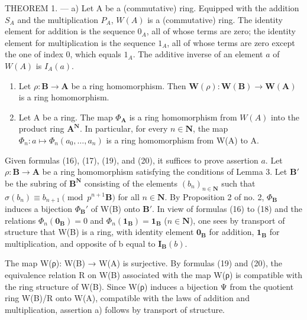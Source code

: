 THEOREM 1. --- a) Let A be a (commutative) ring. Equipped with the addition \(S_A\) and the multiplication \(P_A\), \(W(A)\) is a (commutative) ring. The identity element for addition is the sequence \(0_A\), all of whose terms are zero; the identity element for multiplication is the sequence \(1_A\), all of whose terms are zero except the one of index 0, which equals \(1_A\). The additive inverse of an element \(a\) of \(W(A)\) is \(I_A(a)\).

\begin{enumerate}
\def\labelenumi{\alph{enumi})}
\setcounter{enumi}{1}
\item
  Let \(\rho: \mathbf{B} \to \mathbf{A}\) be a ring homomorphism. Then \(\mathbf{W}(\rho): \mathbf{W}(\mathbf{B}) \to \mathbf{W}(\mathbf{A})\) is a ring homomorphism.
\item
  Let A be a ring. The map \(\Phi_{\mathbf{A}}\) is a ring homomorphism from \(W(A)\) into the product ring \(\mathbf{A}^{\mathbf{N}}\). In particular, for every \(n \in \mathbf{N}\), the map \(\Phi_{n}: a \mapsto \Phi_{n}(a_{0}, \ldots, a_{n})\) is a ring homomorphism from W(A) to A.
\end{enumerate}

Given formulas (16), (17), (19), and (20), it suffices to prove assertion \(a\). Let \(\rho: \mathbf{B} \to \mathbf{A}\) be a ring homomorphism satisfying the conditions of Lemma 3. Let \(\mathbf{B}'\) be the subring of \(\mathbf{B}^{\mathbf{N}}\) consisting of the elements \((b_n)_{n \in \mathbf{N}}\) such that \(\sigma(b_n) \equiv b_{n+1} \pmod{p^{n+1}\mathbf{B}}\) for all \(n \in \mathbf{N}\). By Proposition 2 of no. 2, \(\Phi_{\mathbf{B}}\) induces a bijection \(\Phi_{\mathbf{B}}'\) of W(B) onto \(\mathbf{B}'\). In view of formulas (16) to (18) and the relations \(\Phi_n(\mathbf{0}_{\mathbf{B}}) = 0\) and \(\Phi_n(\mathbf{1}_{\mathbf{B}}) = \mathbf{1}_{\mathbf{B}}\) (\(n \in \mathbf{N}\)), one sees by transport of structure that W(B) is a ring, with identity element \(\mathbf{0}_{\mathbf{B}}\) for addition, \(\mathbf{1}_{\mathbf{B}}\) for multiplication, and opposite of b equal to \(\mathbf{I}_{\mathbf{B}}(b)\).

The map W(ρ): W(B) → W(A) is surjective. By formulas (19) and (20), the equivalence relation R on W(B) associated with the map W(ρ) is compatible with the ring structure of W(B). Since W(ρ) induces a bijection Ψ from the quotient ring W(B)/R onto W(A), compatible with the laws of addition and multiplication, assertion a) follows by transport of structure.


